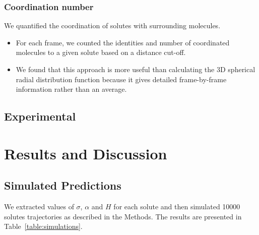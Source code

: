 \documentclass{article}
\begin{document}
  \subsubsection*{Coordination number}

  We quantified the coordination of solutes with surrounding molecules.
  \begin{itemize}
  	\item For each frame, we counted the identities and number of
  	coordinated molecules to a given solute based on a distance cut-off. 
	\item We found that this approach is more useful than calculating the
	3D spherical radial distribution function because it gives detailed
	frame-by-frame information rather than an average. 
  \end{itemize}

  \subsection{Experimental}
   
  \section{Results and Discussion}

  \subsection{Simulated Predictions}\label{section:D_macro}
  
  We extracted values of $\sigma$, $\alpha$ and $H$ for each solute and then
  simulated 10000 solutes trajectories as described in the Methods. The results
  are presented in Table~\ref{table:simulations}.
  
\end{document}
